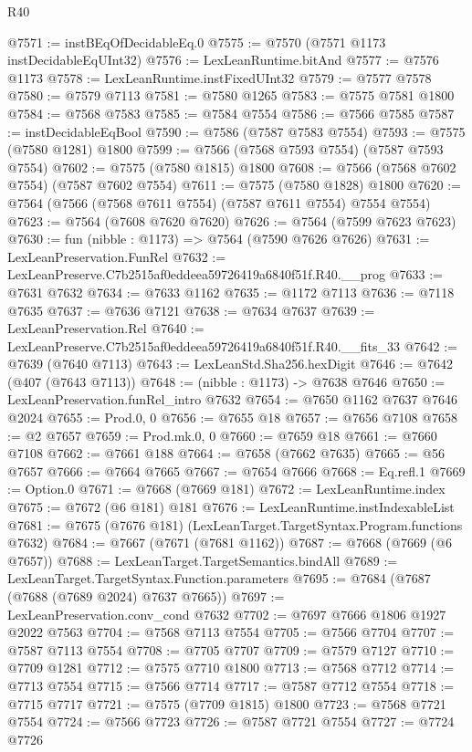 \begin{lexlean}{R40}
\begin{coremodule}
@7571 := instBEqOfDecidableEq.{0}
@7575 := @7570 (@7571 @1173 instDecidableEqUInt32)
@7576 := LexLeanRuntime.bitAnd
@7577 := @7576 @1173
@7578 := LexLeanRuntime.instFixedUInt32
@7579 := @7577 @7578
@7580 := @7579 @7113
@7581 := @7580 @1265
@7583 := @7575 @7581 @1800
@7584 := @7568 @7583
@7585 := @7584 @7554
@7586 := @7566 @7585
@7587 := instDecidableEqBool
@7590 := @7586 (@7587 @7583 @7554)
@7593 := @7575 (@7580 @1281) @1800
@7599 := @7566 (@7568 @7593 @7554) (@7587 @7593 @7554)
@7602 := @7575 (@7580 @1815) @1800
@7608 := @7566 (@7568 @7602 @7554) (@7587 @7602 @7554)
@7611 := @7575 (@7580 @1828) @1800
@7620 := @7564 (@7566 (@7568 @7611 @7554) (@7587 @7611 @7554) @7554 @7554)
@7623 := @7564 (@7608 @7620 @7620)
@7626 := @7564 (@7599 @7623 @7623)
@7630 := fun (nibble : @1173) => @7564 (@7590 @7626 @7626)
@7631 := LexLeanPreservation.FunRel
@7632 := LexLeanPreserve.C7b2515af0eddeea59726419a6840f51f.R40.__prog
@7633 := @7631 @7632
@7634 := @7633 @1162
@7635 := @1172 @7113
@7636 := @7118 @7635
@7637 := @7636 @7121
@7638 := @7634 @7637
@7639 := LexLeanPreservation.Rel
@7640 := LexLeanPreserve.C7b2515af0eddeea59726419a6840f51f.R40.__fits_33
@7642 := @7639 (@7640 @7113)
@7643 := LexLeanStd.Sha256.hexDigit
@7646 := @7642 (@407 (@7643 @7113))
@7648 := (nibble : @1173) -> @7638 @7646
@7650 := LexLeanPreservation.funRel_intro @7632
@7654 := @7650 @1162 @7637 @7646 @2024
@7655 := Prod.{0, 0}
@7656 := @7655 @18
@7657 := @7656 @7108
@7658 := @2 @7657
@7659 := Prod.mk.{0, 0}
@7660 := @7659 @18
@7661 := @7660 @7108
@7662 := @7661 @188
@7664 := @7658 (@7662 @7635)
@7665 := @56 @7657
@7666 := @7664 @7665
@7667 := @7654 @7666
@7668 := Eq.refl.{1}
@7669 := Option.{0}
@7671 := @7668 (@7669 @181)
@7672 := LexLeanRuntime.index
@7675 := @7672 (@6 @181) @181
@7676 := LexLeanRuntime.instIndexableList
@7681 := @7675 (@7676 @181) (LexLeanTarget.TargetSyntax.Program.functions @7632)
@7684 := @7667 (@7671 (@7681 @1162))
@7687 := @7668 (@7669 (@6 @7657))
@7688 := LexLeanTarget.TargetSemantics.bindAll
@7689 := LexLeanTarget.TargetSyntax.Function.parameters
@7695 := @7684 (@7687 (@7688 (@7689 @2024) @7637 @7665))
@7697 := LexLeanPreservation.conv_cond @7632
@7702 := @7697 @7666 @1806 @1927 @2022 @7563
@7704 := @7568 @7113 @7554
@7705 := @7566 @7704
@7707 := @7587 @7113 @7554
@7708 := @7705 @7707
@7709 := @7579 @7127
@7710 := @7709 @1281
@7712 := @7575 @7710 @1800
@7713 := @7568 @7712
@7714 := @7713 @7554
@7715 := @7566 @7714
@7717 := @7587 @7712 @7554
@7718 := @7715 @7717
@7721 := @7575 (@7709 @1815) @1800
@7723 := @7568 @7721 @7554
@7724 := @7566 @7723
@7726 := @7587 @7721 @7554
@7727 := @7724 @7726

\end{coremodule}
\end{lexlean}
